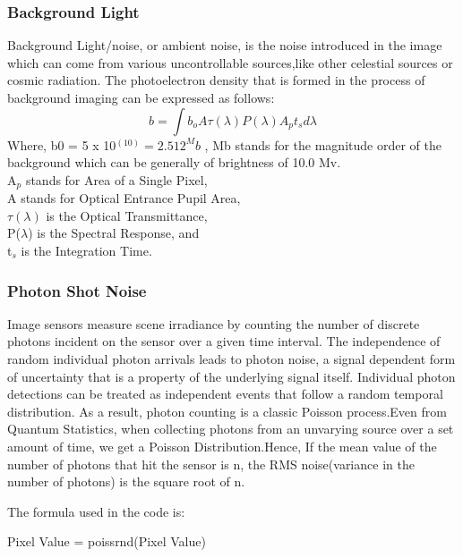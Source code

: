 \documentclass[../../main.tex]{subfiles}
\begin{document}
\subsubsection{Background Light} %
Background Light/noise, or ambient noise, is the noise introduced in the image which can come from various uncontrollable sources,like other celestial sources or cosmic radiation. The photoelectron density that is formed in the process of background imaging can be expressed as follows:
\begin{equation}
  b=\int{b_oA\tau(\lambda)P(\lambda)A_pt_s} d\lambda
\end{equation}
Where, b0 = 5 x 10$^(10) = 2.512^Mb$ , 
Mb stands for the magnitude order of the background which can be generally of brightness of 10.0 Mv. 
\\A$_p$ stands for Area of a Single Pixel,
\\A stands for Optical Entrance Pupil Area,
\\$\tau (\lambda)$ is the Optical Transmittance,
\\P($\lambda$) is the Spectral Response, and
\\t$_s$ is the Integration Time.


\subsubsection{Photon Shot Noise} %
Image sensors measure scene irradiance by counting the number of discrete photons incident on the sensor over a given time interval. The independence of random individual photon arrivals leads to photon noise, a signal dependent form of uncertainty that is a property of the underlying signal itself. Individual photon detections can be treated as independent events that follow a random temporal distribution. As a result, photon counting is a classic Poisson process.Even from Quantum Statistics, when collecting photons from an unvarying source over a set amount of time, we get a Poisson Distribution.Hence, If the mean value of the number of photons that hit the sensor is n, the RMS noise(variance in the number of photons) is the square root of n.

The formula used in the code is:

Pixel Value = poissrnd(Pixel Value)
\end{document}
